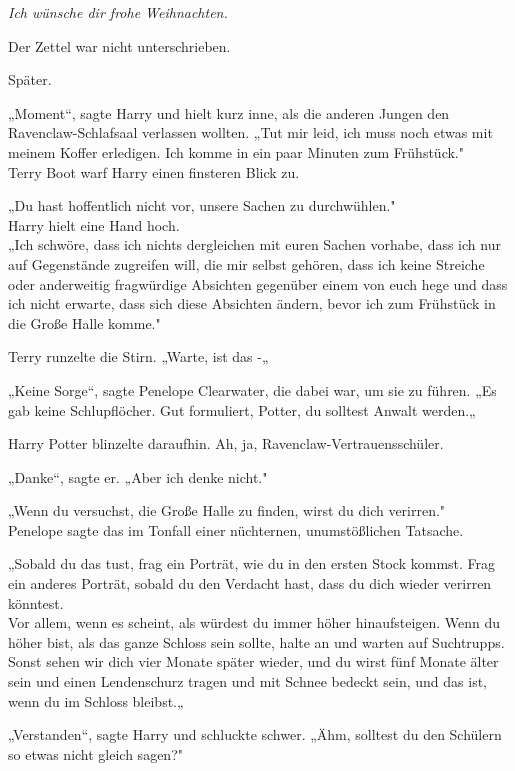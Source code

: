 {\emph{\hfill\break Ich wünsche dir frohe Weihnachten.}

Der Zettel war nicht unterschrieben.

Später.

„Moment“, sagte Harry und hielt kurz inne, als die anderen Jungen den Ravenclaw-Schlafsaal verlassen wollten. „Tut mir leid, ich muss noch etwas mit meinem Koffer erledigen. Ich komme in ein paar Minuten zum Frühstück."\\ Terry Boot warf Harry einen finsteren Blick zu.

„Du hast hoffentlich nicht vor, unsere Sachen zu durchwühlen."\\ Harry hielt eine Hand hoch.\\ „Ich schwöre, dass ich nichts dergleichen mit euren Sachen vorhabe, dass ich nur auf Gegenstände zugreifen will, die mir selbst gehören, dass ich keine Streiche oder anderweitig fragwürdige Absichten gegenüber einem von euch hege und dass ich nicht erwarte, dass sich diese Absichten ändern, bevor ich zum Frühstück in die Große Halle komme."

Terry runzelte die Stirn. „Warte, ist das -„

„Keine Sorge“, sagte Penelope Clearwater, die dabei war, um sie zu führen. „Es gab keine Schlupflöcher. Gut formuliert, Potter, du solltest Anwalt werden.„

Harry Potter blinzelte daraufhin. Ah, ja, Ravenclaw-Vertrauensschüler.

„Danke“, sagte er. „Aber ich denke nicht."

„Wenn du versuchst, die Große Halle zu finden, wirst du dich verirren."\\ Penelope sagte das im Tonfall einer nüchternen, unumstößlichen Tatsache.

„Sobald du das tust, frag ein Porträt, wie du in den ersten Stock kommst. Frag ein anderes Porträt, sobald du den Verdacht hast, dass du dich wieder verirren könntest.\\ Vor allem, wenn es scheint, als würdest du immer höher hinaufsteigen. Wenn du höher bist, als das ganze Schloss sein sollte, halte an und warten auf Suchtrupps.\\ Sonst sehen wir dich vier Monate später wieder, und du wirst fünf Monate älter sein und einen Lendenschurz tragen und mit Schnee bedeckt sein, und das ist, wenn du im Schloss bleibst.„

„Verstanden“, sagte Harry und schluckte schwer. „Ähm, solltest du den Schülern so etwas nicht gleich sagen?"

}
